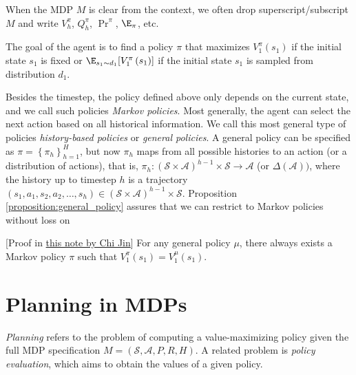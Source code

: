 When the MDP $M$ is clear from the context, we often drop superscript/subscript $M$ and write $V^\pi_h$, $Q^\pi_h$, $\Pr^{\pi}$, $\E_\pi$, etc.

The goal of the agent is to find a policy $\pi$ that maximizes $V_1^\pi\left(s_1\right)$ if the initial state $s_1$ is fixed or $\E_{s_1 \sim d_1} [V_1^\pi\left(s_1\right)]$ if the initial state $s_1$ is sampled from distribution $d_1$.

Besides the timestep, the policy defined above only depends on the current state, and we call such policies {\em Markov policies}.
Most generally, the agent can select the next action based on all historical information.
We call this most general type of policies {\em history-based policies} or {\em general policies}. A general policy can be specified as $\pi=\left\{\pi_h\right\}_{h=1}^H$, but now $\pi_h$ maps from all possible histories to an action (or a distribution of actions), that is, $\pi_h:(\mathcal{S} \times \mathcal{A})^{h-1} \times \mathcal{S} \rightarrow \mathcal{A}$ (or $\Delta(\mathcal{A}))$, where the history up to timestep $h$ is a trajectory $\left(s_1, a_1, s_2, a_2, \ldots, s_h\right) \in(\mathcal{S} \times \mathcal{A})^{h-1} \times \mathcal{S}$. 
Proposition \ref{proposition:general_policy} assures that we can restrict to Markov policies without loss on 
\begin{proposition}\label{proposition:general_policy}
[Proof in \href{https://drive.google.com/file/d/1m80Jil2fMi0pLVgrQvK8iPLnOiVR-SOj/view}{this note by Chi Jin}]
    For any general policy $\mu$, there always exists a Markov policy $\pi$ such that $V^\pi_1(s_1)=V^\mu_1(s_1)$.
\end{proposition}


\section{Planning in MDPs}
{\em Planning} refers to the problem of computing a value-maximizing policy given the full MDP specification $M=(\mathcal{S},\mathcal{A}, P, R, H)$.
A related problem is {\em policy evaluation}, which aims to obtain the values of a given policy. 
